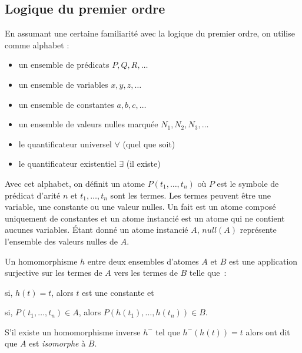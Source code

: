 \subsection{Logique du premier ordre}

En assumant une certaine familiarité avec la logique du premier ordre, on utilise comme alphabet :
\begin{itemize}
    \item un ensemble de prédicats $P, Q, R, \dots$
    \item un ensemble de variables $x, y, z, \dots$
    \item un ensemble de constantes $a, b, c, \dots$
    \item un ensemble de valeurs nulles marquée $N_1, N_2, N_3, \dots$
    \item le quantificateur universel $\forall$ (quel que soit)
    \item le quantificateur existentiel $\exists$ (il existe)
\end{itemize}
Avec cet alphabet, on définit un atome $P(t_1, \dots, t_n)$ où $P$ est le symbole de prédicat d'arité $n$ et $t_1, \dots, t_n$ sont les termes.
Les termes peuvent être une variable, une constante ou une valeur nulles.
Un fait est un atome composé uniquement de constantes et un atome instancié est un atome qui ne contient aucunes variables.
Étant donné un atome instancié $A$, $null(A)$ représente l'ensemble des valeurs nulles de $A$.

Un homomorphisme $h$ entre deux ensembles d'atomes $A$ et $B$ est une application surjective sur les termes de $A$ vers les termes de $B$ telle que :
\begin{enumerate*}[label=(\roman*)]
    \item si, $h(t) = t$, alors $t$ est une constante et
    \item si, $P(t_1, \dots, t_n) \in A$, alors $P(h(t_1), \dots, h(t_n)) \in B$.
\end{enumerate*}
S'il existe un homomorphisme inverse $h^-$ tel que $h^-(h(t)) = t$ alors ont dit que $A$ est \textit{isomorphe} à $B$.

